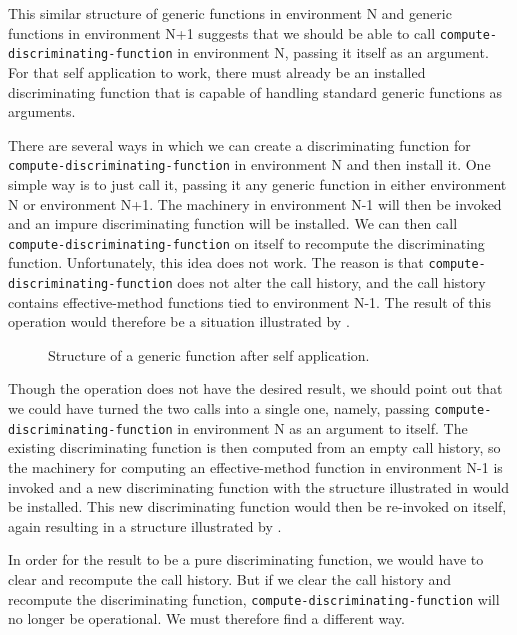 This similar structure of generic functions in environment N and
generic functions in environment N+1 suggests that we should be able
to call \texttt{compute-discriminating-function} in environment N,
passing it itself as an argument.  For that self application to work,
there must already be an installed discriminating function that is
capable of handling standard generic functions as arguments. 

There are several ways in which we can create a discriminating
function for \texttt{compute-discriminating-function} in environment N
and then install it.  One simple way is to just call it, passing it
any generic function in either environment N or environment N+1.  The
machinery in environment N-1 will then be invoked and an impure
discriminating function will be installed.  We can then call
\texttt{compute-discriminating-function} on itself to recompute the
discriminating function.  Unfortunately, this idea does not work.  The
reason is that \texttt{compute-discriminating-function} does not alter
the call history, and the call history contains effective-method
functions tied to environment N-1.  The result of this operation would
therefore be a situation illustrated by
.

\begin{figure}
\begin{center}
\end{center}
\caption{\label{fig-structure-of-generic-function-2}
Structure of a generic function after self application.}
\end{figure}


Though the operation does not have the desired result, we should point
out that we could have turned the two calls into a single one, namely,
passing \texttt{compute-discriminating-function} in environment N as
an argument to itself.  The existing discriminating function is then
computed from an empty call history, so the machinery for computing an
effective-method function in environment N-1 is invoked and a new
discriminating function with the structure illustrated in
 would be installed.  This
new discriminating function would then be re-invoked on itself, again
resulting in a structure illustrated by
.

In order for the result to be a pure discriminating function, we would
have to clear and recompute the call history.  But if we clear the
call history and recompute the discriminating function,
\texttt{compute-discriminating-function} will no longer be
operational.  We must therefore find a different way.

